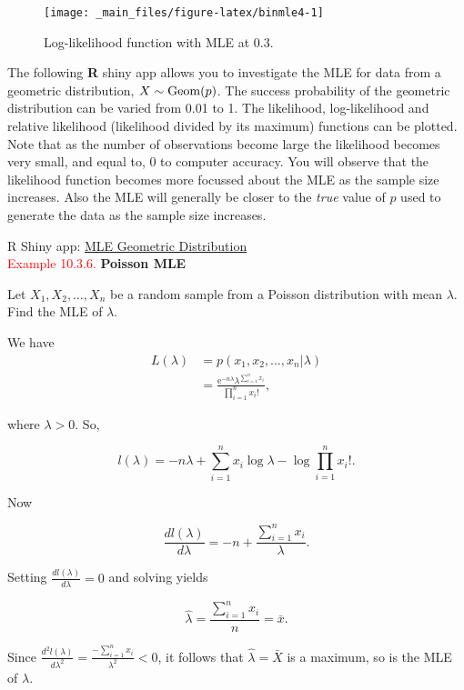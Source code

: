 \documentclass[
]{book}
\begin{document}
\begin{figure}
\texttt{[image: \_main\_files/figure-latex/binmle4-1]} \caption{Log-likelihood function with MLE at 0.3.}\label{fig:binmle4}
\end{figure}

\hfill\break
The following \textbf{R} shiny app allows you to investigate the MLE for data from a geometric distribution, \(X \sim {\rm Geom} (p)\). The success probability of the geometric distribution can be varied from 0.01 to 1. The likelihood, log-likelihood and relative likelihood (likelihood divided by its maximum) functions can be plotted. Note that as the number of observations become large the likelihood becomes very small, and equal to, 0 to computer accuracy. You will observe that the likelihood function becomes more focussed about the MLE as the sample size increases. Also the MLE will generally be closer to the \emph{true} value of \(p\) used to generate the data as the sample size increases.

R Shiny app: \href{https://shiny-new.maths.nottingham.ac.uk/pmzpn/MLE/}{MLE Geometric Distribution}\\

\leavevmode{}%
\textcolor{red}{Example 10.3.6.}
{\textbf{Poisson MLE}}

Let \(X_1,X_2, \ldots, X_n\) be a random sample from a Poisson distribution with mean \(\lambda\). Find the MLE of \(\lambda\).

\hfill\break

We have\\

\begin{align*}
L(\lambda) &= p(x_1,x_2, \ldots, x_n | \lambda) \\[3pt]
&= \frac{ \text{e}^{-n\lambda} \lambda^{\sum_{i=1}^n x_i}}{\prod_{i=1}^n x_i!},
\end{align*}

where \(\lambda>0\). So,

\[ l ( \lambda ) = -n \lambda + \sum\limits_{i=1}^n x_i \log \lambda - \log \prod\limits_{i=1}^n x_i!.\]

Now

\[ \frac{dl(\lambda)}{d\lambda} = -n + \frac{\sum_{i=1}^n x_i}{\lambda}. \]

Setting \(\frac{dl(\lambda)}{d\lambda} =0\) and solving yields

\[ \hat{\lambda} = \frac{\sum_{i=1}^n x_i}{n} = \bar{x}.\]

Since \(\frac{d^2 l(\lambda)}{d\lambda ^2} = \frac{-\sum_{i=1}^n x_i}{\lambda^2} < 0\), it follows that \(\hat{\lambda}=\bar{X}\) is a maximum, so is the MLE of \(\lambda\).
\end{document}
